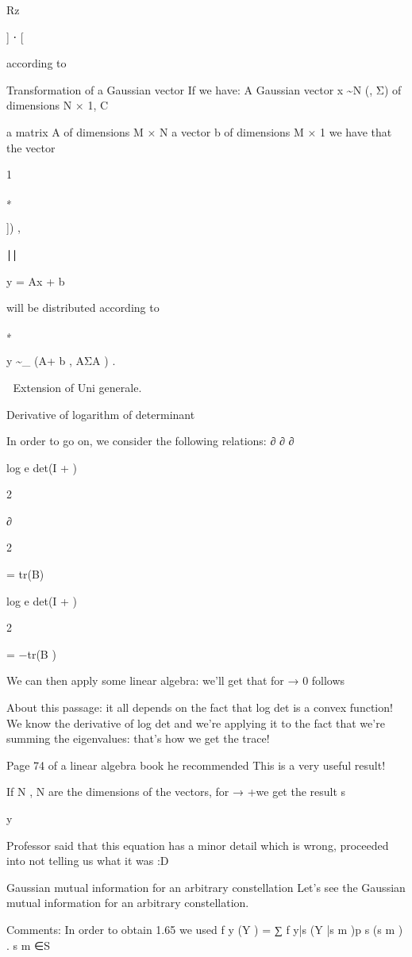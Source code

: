 Rz

] ⋅ [

according to

Transformation of a Gaussian vector If we have:
A Gaussian vector x \sim N (\mu, Σ) of dimensions N × 1,
C

a matrix A of dimensions M × N a vector b of dimensions M × 1 we have that the vector

\sqrt{\rhoA} 1

∗

]) ,

∣∣

y = Ax + b

will be distributed according to

∗

y \sim {}_{} (A\mu + b , AΣA ) .

🔖 Extension of Uni generale.

Derivative of logarithm of determinant

In order to go on, we consider the following relations:
∂
∂\rho
∂

log e det(I + \rhoB)

2

∂\rho

2

= tr(B)

log e det(I + \rhoB)

2

= −tr(B )


We can then apply some linear algebra: we'll get that for \rho → 0 follows

About this passage: it all depends on the fact that log det is a convex function! We know the derivative of log det and we're applying it to the fact that we're summing the eigenvalues: that's how we get the trace!

Page 74 of a linear algebra book he recommended This is a very useful result!

If N , N are the dimensions of the vectors, for \rho → +\infty we get the result s

y

Professor said that this equation has a minor detail which is wrong, proceeded into not telling us what it was :D

Gaussian mutual information for an arbitrary constellation Let's see the Gaussian mutual information for an arbitrary constellation.

Comments:
In order to obtain 1.65 we used f y (Y ) = ∑ f y|s (Y |s m )p s (s m ) .
s m ∈S

